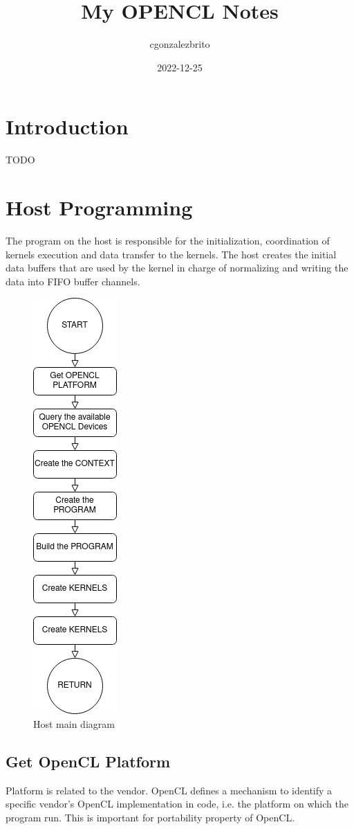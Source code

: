 \documentclass{article}
\title{My OPENCL Notes}
\date{2022-12-25}
\author{cgonzalezbrito}
\begin{document}
  \maketitle
  \newpage
  \section{Introduction}
  TODO
  \section{Host Programming}
  The program on the host is responsible for the initialization, coordination of kernels execution and data transfer to the kernels. The host creates the initial data buffers that are used by the kernel in charge of normalizing and writing the data into FIFO buffer channels.

 \begin{figure}[h!]
    \includegraphics[width=0.2\linewidth]{images/host_diagram.png}
    \caption{Host main diagram}
    \label{Fig 1:Host functions main diagram}
  \end{figure}

  \subsection{Get OpenCL Platform}
  Platform is related to the vendor. OpenCL defines a mechanism to identify a specific vendor’s OpenCL implementation in code, i.e. the platform on which the program run. This is important for portability property of OpenCL.
\end{document}
